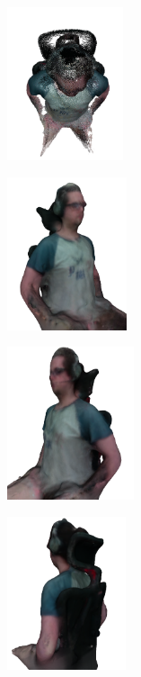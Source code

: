 \begin{figure}[h]
\begin{subfigure}[t]{0.2\textheight}
    \end{subfigure}
    \begin{subfigure}[t]{0.2\textheight}
    	\centering
        \includegraphics[height=4.5cm]{archivos/experimentacion-4-resultado-nube-5.png}
    \end{subfigure}
    \begin{subfigure}[t]{0.2\textheight}
    	\centering
        \includegraphics[height=4.5cm]{archivos/experimentacion-4-resultado-malla.png}
    \end{subfigure}
    \begin{subfigure}[t]{0.2\textheight}
    	\centering
        \includegraphics[height=4.5cm]{archivos/experimentacion-4-resultado-malla-2.png}
    \end{subfigure}
    \begin{subfigure}[t]{0.2\textheight}
    	\centering
        \includegraphics[height=4.5cm]{archivos/experimentacion-4-resultado-malla-3.png}

\end{subfigure}
\end{figure}
